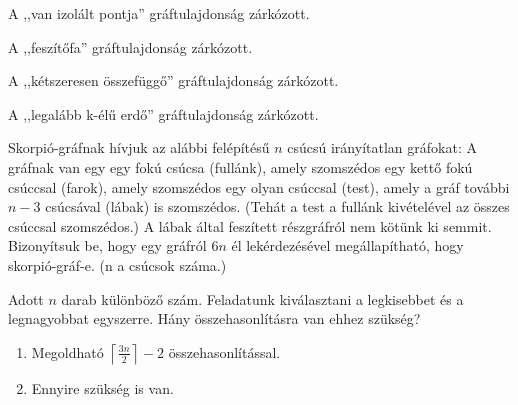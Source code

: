 \begin{Exercise}[counter={sorszam}, difficulty=2]
A ,,van izolált pontja'' gráftulajdonság zárkózott.
\end{Exercise}



\begin{Exercise}[counter={sorszam}, difficulty=0]
A ,,feszítőfa'' gráftulajdonság zárkózott.
\end{Exercise}


\begin{Exercise}[counter={sorszam}, difficulty=0]
A ,,kétszeresen összefüggő'' gráftulajdonság zárkózott.
\end{Exercise}


\begin{Exercise}[counter={sorszam}, difficulty=0]
A ,,legalább k-élű erdő'' gráftulajdonság zárkózott.
\end{Exercise}


\begin{Exercise}[counter={sorszam}, difficulty=0]
Skorpió-gráfnak hívjuk az alábbi felépítésű $n$ csúcsú irányítatlan gráfokat: A gráfnak van egy egy fokú csúcsa (fullánk), amely szomszédos egy kettő fokú csúccsal (farok), amely szomszédos egy olyan csúccsal (test), amely a gráf további $n-3$ csúcsával (lábak) is szomszédos. (Tehát a test a fullánk kivételével az összes csúccsal szomszédos.) A lábak által feszített részgráfról nem kötünk ki semmit.  Bizonyítsuk be, hogy egy gráfról $6n$ él lekérdezésével megállapítható, hogy skorpió-gráf-e. (n a csúcsok száma.)

\end{Exercise}


\begin{Exercise}[counter={sorszam}, difficulty=0]
Adott $n$ darab különböző szám. Feladatunk kiválasztani a legkisebbet és a
legnagyobbat egyszerre. Hány összehasonlításra van ehhez szükség?

\begin{enumerate}
  \item Megoldható $\left \lceil \frac{3n}{2} \right \rceil - 2$ összehasonlítással.
  \item \hard Ennyire szükség is van.
\end{enumerate}
\end{Exercise}


